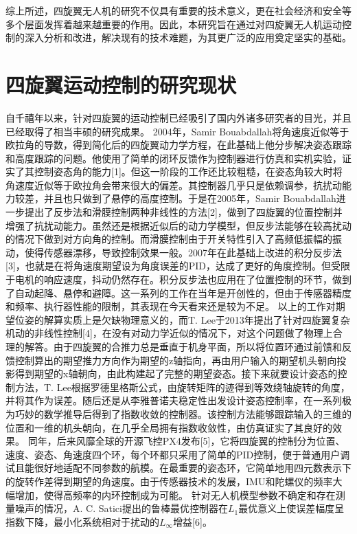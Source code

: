综上所述，四旋翼无人机的研究不仅具有重要的技术意义，更在社会经济和安全等多个层面发挥着越来越重要的作用。因此，本研究旨在通过对四旋翼无人机运动控制的深入分析和改进，解决现有的技术难题，为其更广泛的应用奠定坚实的基础。
\section{四旋翼运动控制的研究现状}

自千禧年以来，针对四旋翼的运动控制已经吸引了国内外诸多研究者的目光，并且已经取得了相当丰硕的研究成果。
2004年，Samir Bouabdallah将角速度近似等于欧拉角的导数，得到简化后的四旋翼动力学方程，在此基础上他分步解决姿态跟踪和高度跟踪的问题。他使用了简单的闭环反馈作为控制器进行仿真和实机实验，证实了其控制姿态角的能力[1]。但这一阶段的工作还比较粗糙，在姿态角较大时将角速度近似等于欧拉角会带来很大的偏差。其控制器几乎只是依赖调参，抗扰动能力较差，并且也只做到了悬停的高度控制。于是在2005年，Samir Bouabdallah进一步提出了反步法和滑膜控制两种非线性的方法[2]，做到了四旋翼的位置控制并增强了抗扰动能力。虽然还是根据近似后的动力学模型，但反步法能够在较高扰动的情况下做到对方向角的控制。而滑膜控制由于开关特性引入了高频低振幅的振动，使得传感器漂移，导致控制效果一般。2007年在此基础上改进的积分反步法[3]，也就是在将角速度期望设为角度误差的PID，达成了更好的角度控制。但受限于电机的响应速度，抖动仍然存在。积分反步法也应用在了位置控制的环节，做到了自动起降、悬停和避障。这一系列的工作在当年是开创性的，但由于传感器精度和频率、执行器性能的限制，其表现在今天看来还是较为不足。
以上的工作对期望位姿的解算实质上是欠缺物理意义的，而T. Lee于2013年提出了针对四旋翼复杂机动的非线性控制[4]，在没有对动力学近似的情况下，对这个问题做了物理上合理的解答。由于四旋翼的合推力总是垂直于机身平面，所以将位置环通过前馈和反馈控制算出的期望推力方向作为期望的z轴指向，再由用户输入的期望机头朝向投影得到期望的x轴朝向，由此构建起了完整的期望姿态。接下来就要设计姿态的控制方法，T. Lee根据罗德里格斯公式，由旋转矩阵的迹得到等效绕轴旋转的角度，并将其作为误差。随后还是从李雅普诺夫稳定性出发设计姿态控制率，在一系列极为巧妙的数学推导后得到了指数收敛的控制器。该控制方法能够跟踪输入的三维的位置和一维的机头朝向，在几乎全局拥有指数收敛性，由仿真证实了其良好的效果。
同年，后来风靡全球的开源飞控PX4发布[5]，它将四旋翼的控制分为位置、速度、姿态、角速度四个环，每个环都只采用了简单的PID控制，便于普通用户调试且能很好地适配不同参数的航模。在最重要的姿态环，它简单地用四元数表示下的旋转作差得到期望的角速度。由于传感器技术的发展，IMU和陀螺仪的频率大幅增加，使得高频率的内环控制成为可能。
针对无人机模型参数不确定和存在测量噪声的情况，A. C. Satici提出的鲁棒最优控制器在$L_1$最优意义上使误差幅度呈指数下降，最小化系统相对于扰动的$L_\infty$增益[6]。
